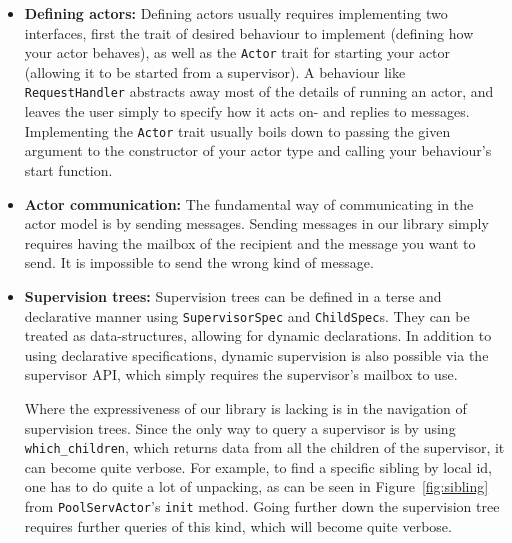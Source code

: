 \documentclass[a4paper]{article}
\newcommand\figref[1]{Figure~\ref{#1}}
\begin{document}
\begin{itemize}
\item {\bf Defining actors:} Defining
actors usually requires implementing two interfaces, first the trait of desired
behaviour to implement (defining how your actor behaves), as well as the
\texttt{Actor} trait for starting your actor (allowing it to be started from a
supervisor). A behaviour like \texttt{RequestHandler} abstracts away most of the
details of running an actor, and leaves the user simply to specify how it acts
on- and replies to messages. Implementing the \texttt{Actor} trait usually boils
down to passing the given argument to the constructor of your actor type and
calling your behaviour's start function.
\item {\bf Actor communication:} The fundamental way of communicating in the
  actor model is by sending messages. Sending messages in our library simply
  requires having the mailbox of the recipient and the message you want to send.
  It is impossible to send the wrong kind of message. %
\item {\bf Supervision trees: } Supervision trees can be defined in a terse and
  declarative manner using \texttt{SupervisorSpec} and
  \texttt{ChildSpec}s. They can be treated as data-structures, allowing for
  dynamic declarations. In addition to using declarative specifications, dynamic
  supervision is also possible via the supervisor API, which simply requires
  the supervisor's mailbox to use.

  Where the expressiveness of our library is lacking is in the navigation of
  supervision trees. Since the only way to query a supervisor is by using
  \texttt{which\_children}, which returns data from all the children of the
  supervisor, it can become quite verbose. For example, to find a specific
  sibling by local id, one has to do quite a lot of unpacking, as can be seen in
  \figref{fig:sibling} from \texttt{PoolServActor}'s \texttt{init} method. Going
  further down the supervision tree requires further queries of this kind, which
  will become quite verbose.


\end{itemize}
\end{document}
